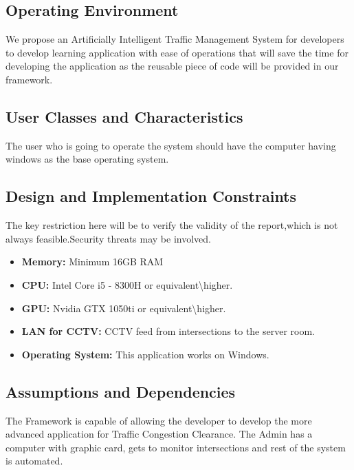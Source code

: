\documentclass[openany,12pt]{report}
\begin{document}
\subsection{Operating Environment}
\hspace*{0.5in}We propose an Artificially Intelligent Traffic Management System for developers to develop learning application with ease of operations that will save the time for developing the application as the reusable piece of code will be provided in our framework.

\subsection{User Classes and Characteristics}
\hspace*{0.5in}The user who is going to operate the system should have the computer having windows as the base operating system.

\subsection{Design and Implementation Constraints}
\hspace*{0.5in}
The key restriction here will be to verify the validity of the report,which is not always feasible.Security threats may be involved.\\
\begin{itemize}
\item{\textbf{Memory:} Minimum 16GB RAM}
\item{\textbf{CPU:} Intel Core i5 - 8300H or equivalent\textbackslash higher.}
\item{\textbf{GPU:} Nvidia GTX 1050ti or equivalent\textbackslash higher.}
\item{\textbf{LAN for CCTV:}  CCTV feed from intersections to the server room.}
\item{\textbf{Operating System:}  This application works on Windows.}
\end{itemize}

\subsection{Assumptions and Dependencies}
\hspace*{0.5in}The Framework is capable of allowing the developer to develop the more advanced application for Traffic Congestion Clearance. The Admin has a
computer with graphic card, gets to monitor intersections and rest of the system is automated.
\end{document}

